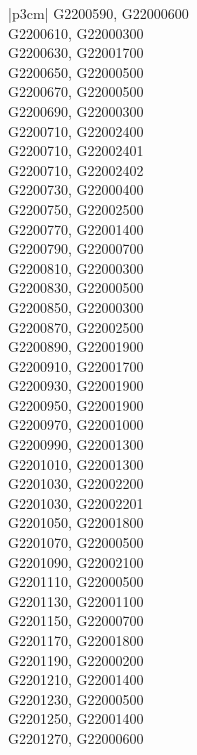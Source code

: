 \begin{customLongTable}{ |p{3cm}| }
G2200590, G22000600 \\ \hline
G2200610, G22000300 \\ \hline
G2200630, G22001700 \\ \hline
G2200650, G22000500 \\ \hline
G2200670, G22000500 \\ \hline
G2200690, G22000300 \\ \hline
G2200710, G22002400 \\ \hline
G2200710, G22002401 \\ \hline
G2200710, G22002402 \\ \hline
G2200730, G22000400 \\ \hline
G2200750, G22002500 \\ \hline
G2200770, G22001400 \\ \hline
G2200790, G22000700 \\ \hline
G2200810, G22000300 \\ \hline
G2200830, G22000500 \\ \hline
G2200850, G22000300 \\ \hline
G2200870, G22002500 \\ \hline
G2200890, G22001900 \\ \hline
G2200910, G22001700 \\ \hline
G2200930, G22001900 \\ \hline
G2200950, G22001900 \\ \hline
G2200970, G22001000 \\ \hline
G2200990, G22001300 \\ \hline
G2201010, G22001300 \\ \hline
G2201030, G22002200 \\ \hline
G2201030, G22002201 \\ \hline
G2201050, G22001800 \\ \hline
G2201070, G22000500 \\ \hline
G2201090, G22002100 \\ \hline
G2201110, G22000500 \\ \hline
G2201130, G22001100 \\ \hline
G2201150, G22000700 \\ \hline
G2201170, G22001800 \\ \hline
G2201190, G22000200 \\ \hline
G2201210, G22001400 \\ \hline
G2201230, G22000500 \\ \hline
G2201250, G22001400 \\ \hline
G2201270, G22000600 \\ \hline

\end{customLongTable}
